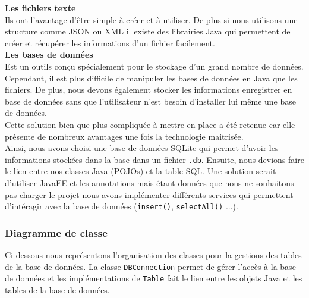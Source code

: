 \documentclass[10pt,a4paper]{article}
\begin{document}
\textbf{Les fichiers texte} \\
Ils ont l'avantage d'être simple à créer et à utiliser. De plus si nous utilisons une structure comme JSON ou XML il existe des librairies Java qui permettent de créer et récupérer les informations d'un fichier facilement. \\

\textbf{Les bases de données} \\
Est un outils conçu spécialement pour le stockage d'un grand nombre de données. Cependant, il est plus difficile de manipuler les bases de données en Java que les fichiers. De plus, nous devons également stocker les informations enregistrer en base de données sans que l'utilisateur n'est besoin d'installer lui même une base de données. \\
Cette solution bien que plus compliquée à mettre en place a été retenue car elle présente de nombreux avantages une fois la technologie maitrisée. \\

Ainsi, nous avons choisi une base de données SQLite qui permet d'avoir les informations stockées dans la base dans un fichier \verb|.db|. Ensuite, nous devions faire le lien entre nos classes Java (POJOs) et la table SQL. Une solution serait d'utiliser JavaEE et les annotations mais étant données que nous ne souhaitons pas charger le projet nous avons implémenter différents services qui permettent d'intéragir avec la base de données (\verb|insert()|, \verb|selectAll()| ...).

\subsubsection{Diagramme de classe} \label{BDD}
Ci-dessous nous représentons l'organisation des classes pour la gestions des tables de la base de données.
La classe \verb|DBConnection| permet de gérer l'accès à la base de données et les implémentations de \verb|Table| fait le lien entre les objets Java et les tables de la base de données.
\end{document}
